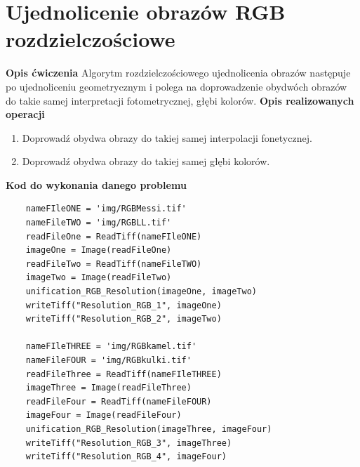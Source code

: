\documentclass[magisterska,openany]{pracadypl}
\begin{document}
\section{Ujednolicenie obrazów RGB rozdzielczościowe}

\vspace{0.5cm}\textbf{\Large Opis ćwiczenia}
\vspace{0.25cm}\newline
Algorytm rozdzielczościowego ujednolicenia obrazów następuje po ujednoliceniu
geometrycznym i polega na doprowadzenie obydwóch obrazów do takie samej interpretacji fotometrycznej, głębi kolorów.
\newline
\newline
\textbf{\Large Opis realizowanych operacji}
\begin{enumerate}
\item Doprowadź obydwa obrazy do takiej samej interpolacji fonetycznej.
\item Doprowadź obydwa obrazy do takiej samej głębi kolorów.
\end{enumerate}

\vspace{0.5cm}
\textbf{\Large Kod do wykonania danego problemu}
\lstset{language=Python}
\vspace{0.25cm}
\begin{lstlisting}
	nameFIleONE = 'img/RGBMessi.tif'
	nameFileTWO = 'img/RGBLL.tif'
	readFileOne = ReadTiff(nameFIleONE)
	imageOne = Image(readFileOne)
	readFileTwo = ReadTiff(nameFileTWO)
	imageTwo = Image(readFileTwo)
	unification_RGB_Resolution(imageOne, imageTwo)
	writeTiff("Resolution_RGB_1", imageOne)
	writeTiff("Resolution_RGB_2", imageTwo)
	
	nameFIleTHREE = 'img/RGBkamel.tif'
	nameFileFOUR = 'img/RGBkulki.tif'
	readFileThree = ReadTiff(nameFIleTHREE)
	imageThree = Image(readFileThree)
	readFileFour = ReadTiff(nameFileFOUR)
	imageFour = Image(readFileFour)
	unification_RGB_Resolution(imageThree, imageFour)
	writeTiff("Resolution_RGB_3", imageThree)
	writeTiff("Resolution_RGB_4", imageFour)

\end{lstlisting}
\end{document}
